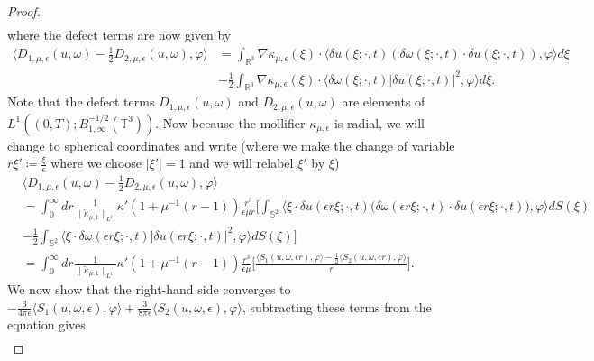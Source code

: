 \documentclass[10pt,a4paper]{amsart}
\begin{document}
\begin{proof}
\begin{align}
\end{align}
where the defect terms are now given by
\begin{align*}
\bigg\langle D_{1,\mu,\epsilon} (u, \omega) - \frac{1}{2} D_{2,\mu,\epsilon} (u, \omega), \varphi \bigg\rangle &= \int_{\mathbb{R}^3} \nabla \kappa_{\mu,\epsilon} (\xi) \cdot \big\langle \delta u (\xi ; \cdot, t) (\delta \omega (\xi ; \cdot, t) \cdot \delta u (\xi ; \cdot, t) ), \varphi \big\rangle d \xi \\
&- \frac{1}{2} \int_{\mathbb{R}^3} \nabla \kappa_{\mu,\epsilon} (\xi) \cdot \big\langle \delta \omega (\xi ; \cdot, t) \lvert \delta u (\xi ; \cdot, t) \rvert^2, \varphi \big\rangle d \xi.
\end{align*}
Note that the defect terms $D_{1,\mu,\epsilon} (u, \omega)$ and $D_{2,\mu,\epsilon} (u, \omega)$ are elements of $L^1 ((0,T);B^{-1/2}_{1,\infty} (\mathbb{T}^3))$. Now because the mollifier $\kappa_{\mu,\epsilon}$ is radial, we will change to spherical coordinates and write (where we make the change of variable $r \xi' \coloneqq \frac{\xi}{\epsilon}$ where we choose $\lvert \xi' \rvert = 1$ and we will relabel $\xi'$ by $\xi$)
\begin{align*}
&\bigg\langle D_{1,\mu,\epsilon} (u, \omega) - \frac{1}{2} D_{2,\mu,\epsilon} (u, \omega), \varphi \bigg\rangle \\
&= \int_{0}^\infty dr \frac{1}{\lVert \widetilde{\kappa}_{\mu,1} \rVert_{L^1}} \kappa' ( 1 + \mu^{-1} (r -1) ) \frac{r^3}{\epsilon \mu r} \bigg[ \int_{\mathbb{S}^2} \big\langle \xi \cdot \delta u (\epsilon r \xi ; \cdot,t) \big(\delta \omega (\epsilon r \xi ;\cdot,t) \cdot \delta u (\epsilon r \xi ; \cdot, t) \big), \varphi \big\rangle d S (\xi) \\
&- \frac{1}{2} \int_{\mathbb{S}^2} \big\langle \xi \cdot \delta \omega (\epsilon r \xi ; \cdot,t) \lvert \delta u (\epsilon r \xi ;\cdot,t) \rvert^2, \varphi \big\rangle d S (\xi) \bigg] \\
&= \int_0^\infty dr \frac{1}{\lVert \widetilde{\kappa}_{\mu,1} \rVert_{L^1}} \kappa' ( 1 + \mu^{-1} (r -1) ) \frac{r^3}{\epsilon \mu} \bigg[ \frac{\langle S_1 (u,\omega, \epsilon r), \varphi \rangle - \frac{1}{2} \langle S_2 (u,\omega, \epsilon r), \varphi \rangle}{r} \bigg].
\end{align*}
We now show that the right-hand side converges to $- \frac{3}{4 \pi \epsilon} \langle S_1 (u,\omega, \epsilon), \varphi \rangle + \frac{3}{8 \pi \epsilon} \langle S_2 (u,\omega, \epsilon), \varphi \rangle$, subtracting these terms from the equation gives
\begin{align*}

\end{align*}
\end{proof}
\end{document}

